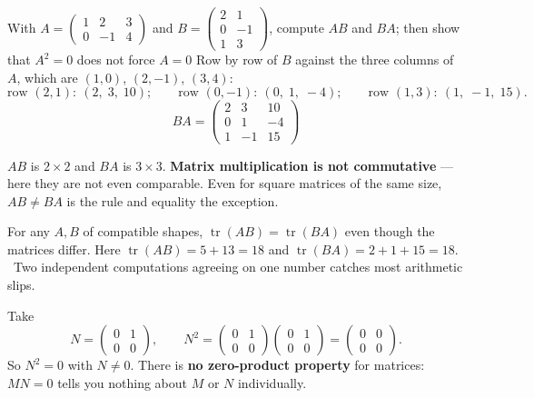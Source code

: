 \begin{worked}{With $A=\begin{pmatrix}1&2&3\\0&-1&4\end{pmatrix}$ and $B=\begin{pmatrix}2&1\\0&-1\\1&3\end{pmatrix}$, compute $AB$ and $BA$; then show that $A^{2}=0$ does not force $A=0$}
Row by row of $B$ against the three columns of $A$, which are
$(1,0)$, $(2,-1)$, $(3,4)$:
\[
  \text{row }(2,1):\ (2,\;3,\;10);\qquad
  \text{row }(0,-1):\ (0,\;1,\;-4);\qquad
  \text{row }(1,3):\ (1,\;-1,\;15).
\]
\[
  BA=\begin{pmatrix}2&3&10\\0&1&-4\\1&-1&15\end{pmatrix}
\]

$AB$ is $2\times2$ and $BA$ is $3\times3$. \textbf{Matrix multiplication is
not commutative} --- here they are not even comparable. Even for square
matrices of the same size, $AB\neq BA$ is the rule and equality the
exception.

For any $A,B$ of compatible shapes, $\operatorname{tr}(AB)=\operatorname{tr}(BA)$
even though the matrices differ. Here $\operatorname{tr}(AB)=5+13=18$ and
$\operatorname{tr}(BA)=2+1+15=18$. \checkmark\ Two independent computations
agreeing on one number catches most arithmetic slips.

Take
\[
  N=\begin{pmatrix}0&1\\0&0\end{pmatrix},
  \qquad
  N^{2}=\begin{pmatrix}0&1\\0&0\end{pmatrix}\begin{pmatrix}0&1\\0&0\end{pmatrix}
  =\begin{pmatrix}0&0\\0&0\end{pmatrix} .
\]
So $N^{2}=0$ with $N\neq0$. There is \textbf{no zero-product property} for
matrices: $MN=0$ tells you nothing about $M$ or $N$ individually.


\end{worked}
